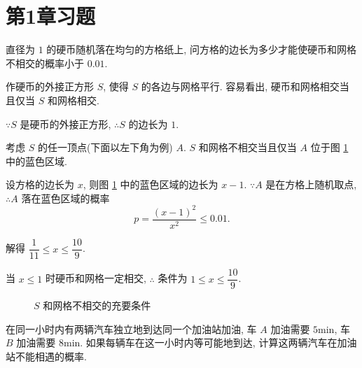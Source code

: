 \documentclass[color=black,device=normal,lang=cn]{elegantnote}
\numberwithin{equation}{section}
\theoremstyle{plain}
\newcounter{exsection}[section]
\numberwithin{exercise}{exsection}
\begin{document}
\section{第1章习题}
\addtocounter{exercise}{12}
\begin{exercise}%
    直径为 $1$ 的硬币随机落在均匀的方格纸上, 问方格的边长为多少才能使硬币和网格不相交的概率小于 $0.01$.
\end{exercise}
\begin{solution}
    作硬币的外接正方形 $S$, 使得 $S$ 的各边与网格平行. 容易看出, 硬币和网格相交当且仅当 $S$ 和网格相交.

    $\because S$ 是硬币的外接正方形, $\therefore S$ 的边长为 $1$.

    考虑 $S$ 的任一顶点(下面以左下角为例) $A$. $S$ 和网格不相交当且仅当 $A$ 位于图 \ref{f1.1} 中的蓝色区域.

    设方格的边长为 $x$, 则图 \ref{f1.1} 中的蓝色区域的边长为 $x-1$. $\because A$ 是在方格上随机取点, $\therefore A$ 落在蓝色区域的概率
    \[p=\dfrac{(x-1)^2}{x^2}\leq0.01.\]

    解得 $\dfrac{1}{11}\leq x\leq\dfrac{10}{9}$.

    当 $x\leq1$ 时硬币和网格一定相交, $\therefore$ 条件为 $1\leq x\leq\dfrac{10}{9}$.
\end{solution}
\begin{figure}[htbp!]
    \centering
    \caption{$S$ 和网格不相交的充要条件}\label{f1.1}
\end{figure}
\begin{exercise}%
    在同一小时内有两辆汽车独立地到达同一个加油站加油, 车 $A$ 加油需要 $5\text{min}$, 车 $B$ 加油需要 $8\text{min}$. 如果每辆车在这一小时内等可能地到达, 计算这两辆汽车在加油站不能相遇的概率.
\end{exercise}
\end{document}
